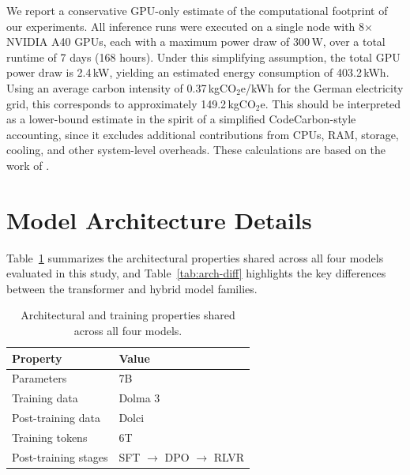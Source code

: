 \documentclass[11pt]{article}
\theoremstyle{definition}
\begin{document}
We report a conservative GPU-only estimate of the computational footprint of our experiments. All inference runs were executed on a single node with 8$\times$ NVIDIA A40 GPUs, each with a maximum power draw of 300\,W, over a total runtime of 7 days (168 hours). Under this simplifying assumption, the total GPU power draw is 2.4\,kW, yielding an estimated energy consumption of 403.2\,kWh. Using an average carbon intensity of 0.37\,kgCO$_2$e/kWh for the German electricity grid, this corresponds to approximately 149.2\,kgCO$_2$e. This should be interpreted as a lower-bound estimate in the spirit of a simplified CodeCarbon-style accounting, since it excludes additional contributions from CPUs, RAM, storage, cooling, and other system-level overheads. These calculations are based on the work of \citet{lacoste2019quantifyingcarbonemissionsmachine}.


\section{Model Architecture Details}
\label{app:model-architecture}

Table~\ref{tab:arch-shared} summarizes the architectural properties shared across all four models evaluated in this study, and Table~\ref{tab:arch-diff} highlights the key differences between the transformer and hybrid model families.

\begin{table}
\centering
\small
\begin{tabular}{lp{3cm}}
\toprule
\textbf{Property} & \textbf{Value} \\
\midrule
Parameters          & 7B \\
Training data       & Dolma 3 \\
Post-training data  & Dolci \\
Training tokens     & 6T \\
Post-training stages & SFT $\rightarrow$ DPO $\rightarrow$ RLVR \\
\bottomrule
\end{tabular}
\caption{Architectural and training properties shared across all four models.}
\label{tab:arch-shared}
\end{table}
 
\end{document}
